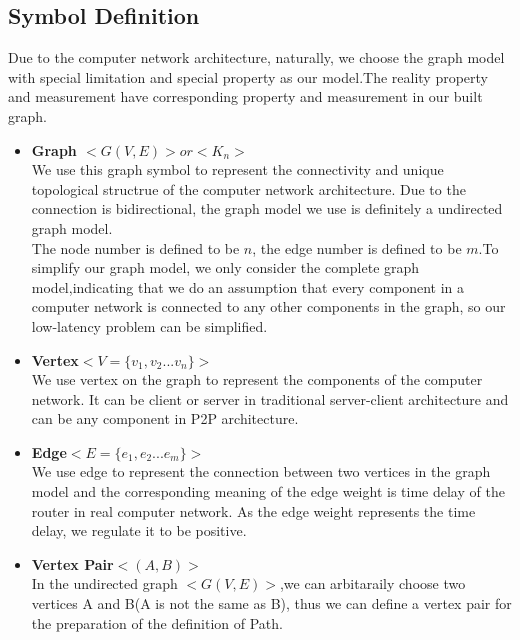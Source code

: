 \documentclass{elegantpaper}
\begin{document}
\subsection{Symbol Definition}
Due to the computer network architecture, naturally, we choose the graph model with special limitation and special property as our model.The reality property and measurement have corresponding property and measurement in our built graph.
 \begin{itemize}[noitemsep]\item\textbf{Graph   \quad$<G(V,E)> or <K_n>$}\\
 We use this graph symbol to represent the connectivity and unique topological structrue of the computer network architecture. Due to the connection is bidirectional, the graph model we use is definitely a undirected graph model.\\
  The node number is defined to be $n$, the edge number is defined to be $m$.To simplify our graph model, we only consider the complete graph model,indicating that we do an assumption that every component in a computer network is connected to any other components in the graph, so our low-latency problem can be simplified.
 \end{itemize}
 
  \begin{itemize}[noitemsep]\item\textbf{Vertex\quad $<V=\{v_1,v_2...v_n\}>$}\\
 We use vertex on the graph to represent the components of the computer network. It can be client or server in traditional server-client architecture and can be any component in P2P architecture.

 \end{itemize}
 
 \begin{itemize}[noitemsep]\item\textbf{Edge\quad $<E=\{e_1,e_2...e_m\}>$}\\
 We use edge to represent the connection between two vertices in the graph model and the corresponding meaning of the edge weight is time delay of the router in real computer network. As the edge weight represents the time delay, we regulate it to be positive.
  \end{itemize}
  
\begin{itemize}[noitemsep]\item\textbf{Vertex Pair\quad $<(A,B)>$}\\
 In the undirected graph $<G(V,E)>$,we can arbitaraily choose two vertices A and B(A is not the same as B), thus we can define a vertex pair for the preparation of the definition of Path.
 \end{itemize}
 
\end{document}

